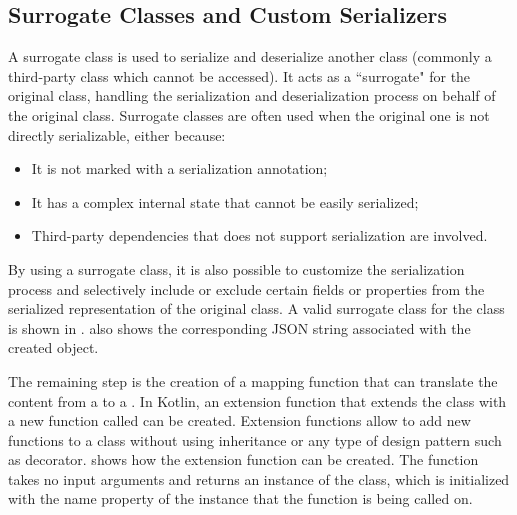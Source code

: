 

\subsection{Surrogate Classes and Custom Serializers}
\label{ssec:surrogate-classes-and-custom-serializers}

A surrogate class is used to serialize and deserialize another class (commonly a third-party class which cannot be accessed). It acts as a ``surrogate" for the original class, handling the serialization and deserialization process on behalf of the original class. Surrogate classes are often used when the original one is not directly serializable, either because:
\begin{itemize}
	\item It is not marked with a serialization annotation;
	\item It has a complex internal state that cannot be easily serialized;
	\item Third-party dependencies that does not support serialization are involved.
\end{itemize}
By using a surrogate class, it is also possible to customize the serialization process and selectively include or exclude certain fields or properties from the serialized representation of the original class. A valid surrogate class for the  class is shown in .  also shows the corresponding JSON string associated with the created object.\newline

The remaining step is the creation of a mapping function that can translate the content from a  to a . In Kotlin, an extension function that extends the  class with a new function called  can be created. Extension functions allow to add new functions to a class without using inheritance or any type of design pattern such as decorator.  shows how the extension function can be created. The function takes no input arguments and returns an instance of the  class, which is initialized with the name property of the  instance that the function is being called on.\newline


